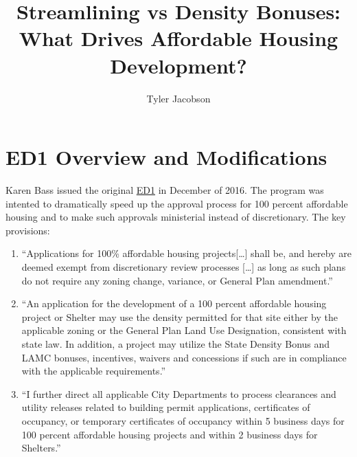 \documentclass[12pt]{article}
\title{Streamlining vs Density Bonuses: \\
 What Drives Affordable Housing Development?}
\author{Tyler Jacobson}
\theoremstyle{definition}
\begin{document}
\maketitle
\section{ED1 Overview and Modifications}
Karen Bass issued the original \hyperlink{https://mayor.lacity.gov/news/mayor-bass-signs-executive-directive-dramatically-accelerate-and-lower-cost-affordable-housing}{ED1} in December of 2016. The program was intented to dramatically speed up the approval process for 100 percent affordable housing and to make such approvals ministerial instead of discretionary. The key provisions:
\begin{enumerate}
    \item ``Applications for 100\% affordable housing projects[\dots] shall be, and hereby are deemed exempt from discretionary review processes [\dots] as long as such plans do not require any zoning change, variance, or General Plan amendment.'' 
    \item ``An application for the development of a 100 percent affordable housing project or Shelter may use the density permitted for that site either by the applicable zoning or the General Plan Land Use Designation, consistent with state law. In addition, a project may utilize the State Density Bonus and LAMC bonuses, incentives, waivers and concessions if such are in compliance with the applicable requirements.'' 
    \item ``I further direct all applicable City Departments to process clearances and utility releases related to building permit applications, certificates of occupancy, or temporary certificates of occupancy within 5 business days for 100 percent affordable housing projects and within 2 business days for Shelters.''
\end{enumerate}
\end{document}
